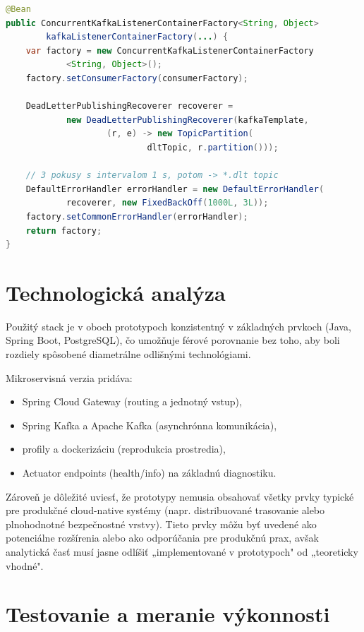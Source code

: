\begin{lstlisting}[language=Java, breaklines=true, caption={Konfigurácia Dead Letter Topic -- 3 pokusy, interval 1\,s (KafkaConsumerConfig.java)}]
@Bean
public ConcurrentKafkaListenerContainerFactory<String, Object>
        kafkaListenerContainerFactory(...) {
    var factory = new ConcurrentKafkaListenerContainerFactory
            <String, Object>();
    factory.setConsumerFactory(consumerFactory);

    DeadLetterPublishingRecoverer recoverer =
            new DeadLetterPublishingRecoverer(kafkaTemplate,
                    (r, e) -> new TopicPartition(
                            dltTopic, r.partition()));

    // 3 pokusy s intervalom 1 s, potom -> *.dlt topic
    DefaultErrorHandler errorHandler = new DefaultErrorHandler(
            recoverer, new FixedBackOff(1000L, 3L));
    factory.setCommonErrorHandler(errorHandler);
    return factory;
}
\end{lstlisting}

\section{Technologická analýza}

Použitý stack je v oboch prototypoch konzistentný v základných prvkoch (Java, Spring Boot, PostgreSQL), čo umožňuje férové porovnanie bez toho, aby boli rozdiely spôsobené diametrálne odlišnými technológiami.

Mikroservisná verzia pridáva:
\begin{itemize}
    \item Spring Cloud Gateway (routing a jednotný vstup),
    \item Spring Kafka a Apache Kafka (asynchrónna komunikácia),
    \item profily a dockerizáciu (reprodukcia prostredia),
    \item Actuator endpoints (health/info) na základnú diagnostiku.
\end{itemize}

Zároveň je dôležité uviesť, že prototypy nemusia obsahovať všetky prvky typické pre produkčné cloud-native systémy (napr. distribuované trasovanie alebo plnohodnotné bezpečnostné vrstvy). Tieto prvky môžu byť uvedené ako potenciálne rozšírenia alebo ako odporúčania pre produkčnú prax, avšak analytická časť musí jasne odlíšiť „implementované v prototypoch" od „teoreticky vhodné".

\section{Testovanie a meranie výkonnosti}

